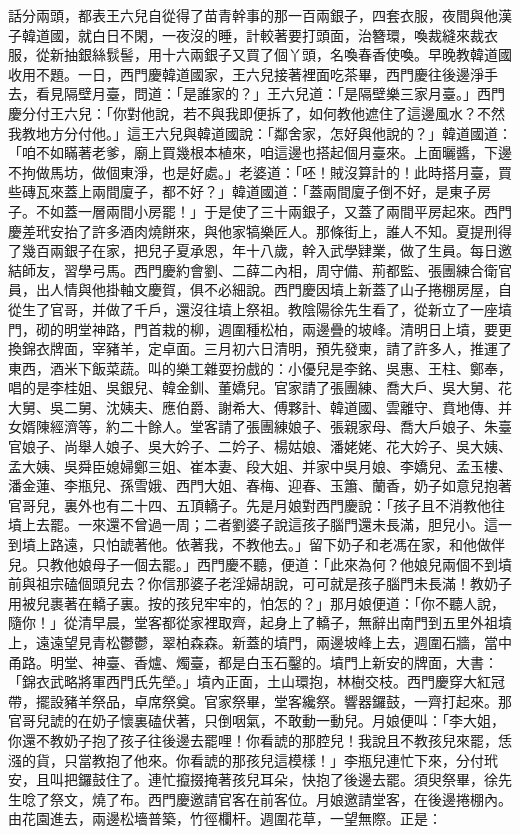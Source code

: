 話分兩頭，都表王六兒自從得了苗青幹事的那一百兩銀子，四套衣服，夜間與他漢子韓道國，就白日不閑，一夜沒的睡，計較著要打頭面，治簪環，喚裁縫來裁衣服，從新抽銀絲䯼髻，用十六兩銀子又買了個丫頭，名喚春香使喚。早晚教韓道國收用不題。一日，西門慶韓道國家，王六兒接著裡面吃茶畢，西門慶往後邊淨手去，看見隔壁月臺，問道：「是誰家的？」王六兒道：「是隔壁樂三家月臺。」西門慶分付王六兒：「你對他說，若不與我即便拆了，如何教他遮住了這邊風水？不然我教地方分付他。」這王六兒與韓道國說：「鄰舍家，怎好與他說的？」韓道國道：「咱不如瞞著老爹，廟上買幾根本植來，咱這邊也搭起個月臺來。上面曬醬，下邊不拘做馬坊，做個東淨，也是好處。」老婆道：「呸！賊沒算計的！此時搭月臺，買些磚瓦來蓋上兩間廈子，都不好？」韓道國道：「蓋兩間廈子倒不好，是東子房子。不如蓋一層兩間小房罷！」于是使了三十兩銀子，又蓋了兩間平房起來。西門慶差玳安抬了許多酒肉燒餅來，與他家犒樂匠人。那條街上，誰人不知。夏提刑得了幾百兩銀子在家，把兒子夏承恩，年十八歲，幹入武學肄業，做了生員。每日邀結師友，習學弓馬。西門慶約會劉、二薛二內相，周守備、荊都監、張團練合衛官員，出人情與他掛軸文慶賀，俱不必細說。西門慶因墳上新蓋了山子捲棚房屋，自從生了官哥，并做了千戶，還沒往墳上祭祖。教陰陽徐先生看了，從新立了一座墳門，砌的明堂神路，門首栽的柳，週圍種松柏，兩邊疊的坡峰。清明日上墳，要更換錦衣牌面，宰豬羊，定卓面。三月初六日清明，預先發柬，請了許多人，推運了東西，酒米下飯菜蔬。叫的樂工雜耍扮戲的：小優兒是李銘、吳惠、王柱、鄭奉，唱的是李桂姐、吳銀兒、韓金釧、董嬌兒。官家請了張團練、喬大戶、吳大舅、花大舅、吳二舅、沈姨夫、應伯爵、謝希大、傅夥計、韓道國、雲離守、賁地傳、并女婿陳經濟等，約二十餘人。堂客請了張團練娘子、張親家母、喬大戶娘子、朱臺官娘子、尚舉人娘子、吳大妗子、二妗子、楊姑娘、潘姥姥、花大妗子、吳大姨、孟大姨、吳舜臣媳婦鄭三姐、崔本妻、段大姐、并家中吳月娘、李嬌兒、孟玉樓、潘金蓮、李瓶兒、孫雪娥、西門大姐、春梅、迎春、玉簫、蘭香，奶子如意兒抱著官哥兒，裏外也有二十四、五頂轎子。先是月娘對西門慶說：「孩子且不消教他往墳上去罷。一來還不曾過一周；二者劉婆子說這孩子腦門還未長滿，胆兒小。這一到墳上路遠，只怕諕著他。依著我，不教他去。」留下奶子和老馮在家，和他做伴兒。只教他娘母子一個去罷。」西門慶不聽，便道：「此來為何？他娘兒兩個不到墳前與祖宗磕個頭兒去？你信那婆子老淫婦胡說，可可就是孩子腦門未長滿！教奶子用被兒裹著在轎子裏。按的孩兒牢牢的，怕怎的？」那月娘便道：「你不聽人說，隨你！」從清早晨，堂客都從家裡取齊，起身上了轎子，無辭出南門到五里外祖墳上，遠遠望見青松鬱鬱，翠柏森森。新蓋的墳門，兩邊坡峰上去，週圍石牆，當中甬路。明堂、神臺、香爐、燭臺，都是白玉石鑿的。墳門上新安的牌面，大書：「錦衣武略將軍西門氏先塋。」墳內正面，土山環抱，林樹交枝。西門慶穿大紅冠帶，擺設豬羊祭品，卓席祭奠。官家祭畢，堂客纔祭。響器鑼鼓，一齊打起來。那官哥兒諕的在奶子懷裏磕伏著，只倒咽氣，不敢動一動兒。月娘便叫：「李大姐，你還不教奶子抱了孩子往後邊去罷哩！你看諕的那腔兒！我說且不教孩兒來罷，恁漒的貨，只當教抱了他來。你看諕的那孩兒這模樣！」李瓶兒連忙下來，分付玳安，且叫把鑼鼓住了。連忙攛掇掩著孩兒耳朵，快抱了後邊去罷。須臾祭畢，徐先生唸了祭文，燒了布。西門慶邀請官客在前客位。月娘邀請堂客，在後邊捲棚內。由花園進去，兩邊松墻普築，竹徑欄杆。週圍花草，一望無際。正是：

